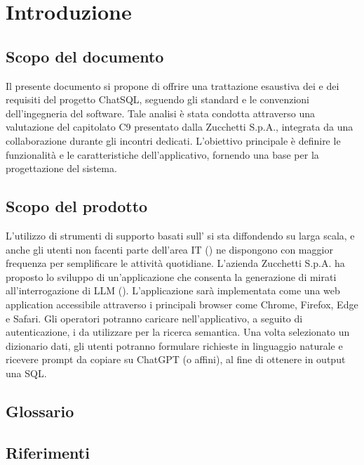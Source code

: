 \section{Introduzione}

\subsection{Scopo del documento}
\par Il presente documento si propone di offrire una trattazione esaustiva dei  e dei requisiti del progetto ChatSQL, seguendo gli standard e le convenzioni dell'ingegneria del software. Tale analisi è stata condotta attraverso una valutazione del capitolato C9 presentato dalla  Zucchetti S.p.A., integrata da una collaborazione durante gli incontri dedicati. L'obiettivo principale è definire le funzionalità e le caratteristiche dell’applicativo, fornendo una base per la progettazione del sistema.

\subsection{Scopo del prodotto}
\par L’utilizzo di strumenti di supporto basati sull’ si sta diffondendo su larga scala, e anche gli utenti non facenti parte dell’area IT () ne dispongono con maggior frequenza per semplificare le attività quotidiane. L’azienda Zucchetti S.p.A. ha proposto lo sviluppo di un’applicazione che consenta la generazione di  mirati all’interrogazione di LLM (). L'applicazione sarà implementata come una web application accessibile attraverso i principali browser come Chrome, Firefox, Edge e Safari. Gli operatori potranno caricare nell’applicativo, a seguito di autenticazione, i  da utilizzare per la ricerca semantica. Una volta selezionato un dizionario dati, gli utenti potranno formulare richieste in linguaggio naturale e ricevere prompt da copiare su ChatGPT (o affini), al fine di ottenere in output una  SQL.

\subsection{Glossario}
\GlossarioIntroduzione

\subsection{Riferimenti}
